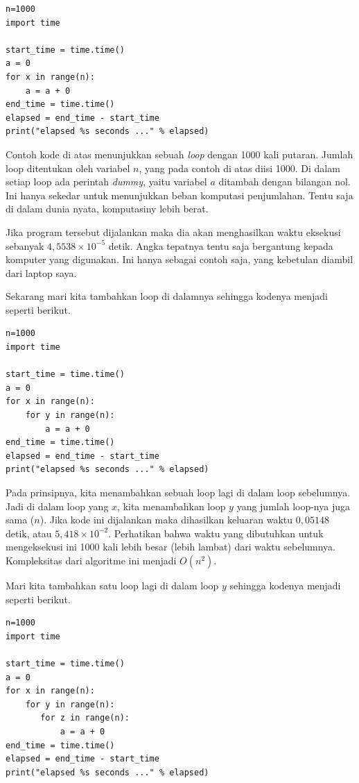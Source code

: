 \begin{verbatim}
n=1000
import time

start_time = time.time()
a = 0
for x in range(n):
    a = a + 0
end_time = time.time()
elapsed = end_time - start_time
print("elapsed %s seconds ..." % elapsed)
\end{verbatim}

Contoh kode di atas menunjukkan sebuah {\em loop} dengan 1000 kali putaran.
Jumlah loop ditentukan oleh variabel $n$, yang pada contoh di atas diisi 1000.
Di dalam setiap loop ada perintah {\em dummy}, yaitu variabel $a$ ditambah
dengan bilangan nol. Ini hanya sekedar untuk menunjukkan beban komputasi penjumlahan.
Tentu saja di dalam dunia nyata, komputasiny lebih berat.

Jika program tersebut dijalankan maka dia akan menghasilkan waktu eksekusi
sebanyak $4,5538 \times 10^{-5}$ detik.
Angka tepatnya tentu saja bergantung kepada komputer yang digunakan.
Ini hanya sebagai contoh saja, yang kebetulan diambil dari laptop saya.

Sekarang mari kita tambahkan loop di dalamnya sehingga kodenya menjadi seperti berikut.

\begin{verbatim}
n=1000
import time

start_time = time.time()
a = 0
for x in range(n):
    for y in range(n):
        a = a + 0
end_time = time.time()
elapsed = end_time - start_time
print("elapsed %s seconds ..." % elapsed)
\end{verbatim}

Pada prinsipnya, kita menambahkan sebuah loop lagi di dalam loop sebelumnya.
Jadi di dalam loop yang $x$, kita menambahkan loop $y$ yang jumlah loop-nya
juga sama ($n$). Jika kode ini dijalankan maka dihasilkan keluaran waktu
$0,05148$ detik, atau $5,418 \times 10^{-2}$.
Perhatikan bahwa waktu yang dibutuhkan untuk mengeksekusi ini 1000 kali
lebih besar (lebih lambat) dari waktu sebelumnya.
Kompleksitas dari algoritme ini menjadi $O(n^2)$.

Mari kita tambahkan satu loop lagi di dalam loop $y$ sehingga kodenya menjadi
seperti berikut.

\begin{verbatim}
n=1000
import time

start_time = time.time()
a = 0
for x in range(n):
    for y in range(n):
       for z in range(n): 
           a = a + 0
end_time = time.time()
elapsed = end_time - start_time
print("elapsed %s seconds ..." % elapsed)
\end{verbatim}

